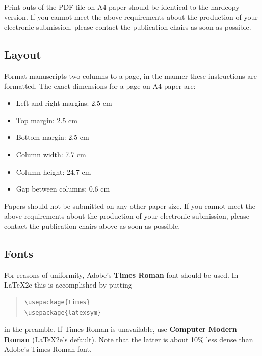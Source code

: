\documentclass[11pt,a4paper]{article}
\begin{document}
Print-outs of the PDF file on A4 paper should be identical to the
hardcopy version. If you cannot meet the above requirements about the
production of your electronic submission, please contact the
publication chairs as soon as possible.

\subsection{Layout}
\label{ssec:layout}

Format manuscripts two columns to a page, in the manner these
instructions are formatted. The exact dimensions for a page on A4
paper are:

\begin{itemize}
\item Left and right margins: 2.5 cm
\item Top margin: 2.5 cm
\item Bottom margin: 2.5 cm
\item Column width: 7.7 cm
\item Column height: 24.7 cm
\item Gap between columns: 0.6 cm
\end{itemize}

\noindent Papers should not be submitted on any other paper size.
 If you cannot meet the above requirements about the production of 
 your electronic submission, please contact the publication chairs 
 above as soon as possible.

\subsection{Fonts}

For reasons of uniformity, Adobe's \textbf{Times Roman} font should be
used. In \LaTeX2e{} this is accomplished by putting

\begin{quote}
\begin{verbatim}
\usepackage{times}
\usepackage{latexsym}
\end{verbatim}
\end{quote}
in the preamble. If Times Roman is unavailable, use \textbf{Computer
  Modern Roman} (\LaTeX2e{}'s default).  Note that the latter is about
  10\% less dense than Adobe's Times Roman font.
\end{document}
